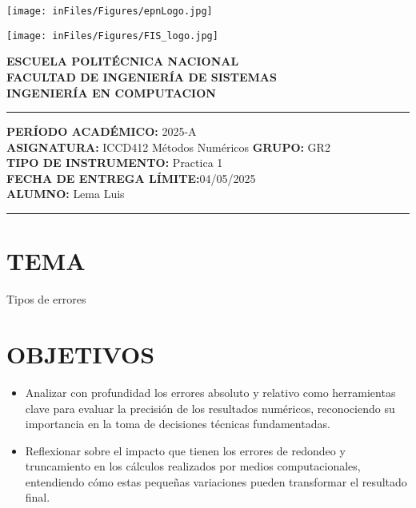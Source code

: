 \documentclass[12pt]{article}
\begin{document}
\begin{minipage}{0.45\textwidth}
    \texttt{[image: inFiles/Figures/epnLogo.jpg]}
\end{minipage}
\hfill
\begin{minipage}{0.45\textwidth}
    \raggedleft
    \texttt{[image: inFiles/Figures/FIS\_logo.jpg]}
\end{minipage}

\vspace{0.5cm}

\begin{center}
    \textbf{ESCUELA POLITÉCNICA NACIONAL}\\[0.2cm]
    \textbf{FACULTAD DE INGENIERÍA DE SISTEMAS}\\[0.2cm]
    \textbf{INGENIERÍA {\textbf{EN COMPUTACION}}}
\end{center}

\vspace{0.5cm}
\hrule
\vspace{0.5cm}

\noindent\textbf{PERÍODO ACADÉMICO:} 2025-A\\[0.2cm]
\noindent\textbf{ASIGNATURA:} ICCD412 Métodos Numéricos \hfill \textbf{GRUPO:} GR2\\[0.2cm]
\noindent\textbf{TIPO DE INSTRUMENTO:} {Practica 1}\\[0.2cm]
\noindent\textbf{FECHA DE ENTREGA LÍMITE:}{04/05/2025}\\[0.2cm]
\noindent\textbf{ALUMNO:} {Lema Luis}

\vspace{0.5cm}
\hrule
\vspace{1cm}


\section*{TEMA}
{Tipos de errores}

\vspace{0.5cm}

\section*{OBJETIVOS}
\begin{itemize}
    \item {Analizar con profundidad los errores absoluto y relativo como herramientas clave para evaluar la precisión de los resultados numéricos,
     reconociendo su importancia en la toma de decisiones técnicas fundamentadas.}

     \item {Reflexionar sobre el impacto que tienen los errores de redondeo y truncamiento en los cálculos realizados por medios computacionales, 
     entendiendo cómo estas pequeñas variaciones pueden transformar el resultado final.}
\end{itemize}
\end{document}
